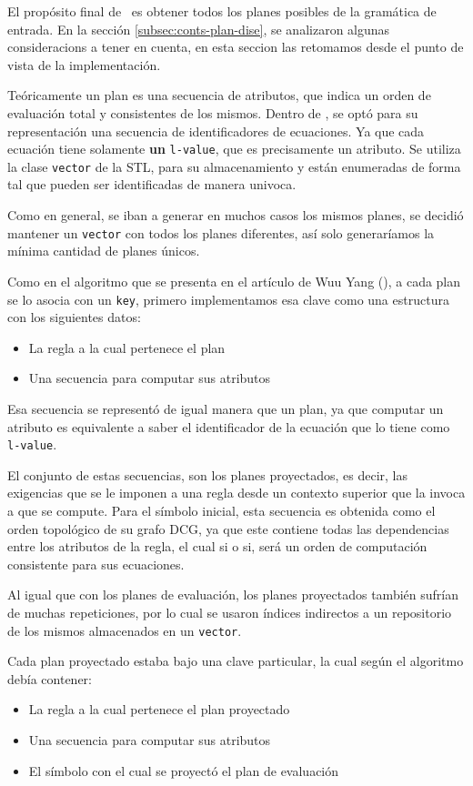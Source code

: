 El propósito final de \maggen\ es obtener todos los planes posibles de la gramática de entrada. En la sección \ref{subsec:conts-plan-dise}, se analizaron algunas consideracions a tener en cuenta, en esta seccion las retomamos desde el punto de vista de la implementación. 

Teóricamente un plan es una secuencia de atributos, que indica un orden de evaluación total y consistentes de los mismos. Dentro de \maggen, se optó para su representación una secuencia de identificadores de ecuaciones. Ya que cada ecuación tiene solamente \textbf{un} \texttt{l-value}, que es precisamente un atributo. Se utiliza la clase \texttt{vector} de la STL, para su almacenamiento y están enumeradas de forma tal que pueden ser identificadas de manera univoca.

Como en general, se iban a generar en muchos casos los mismos planes, se decidió mantener un \texttt{vector} con todos los planes diferentes, así solo generaríamos la mínima cantidad de planes únicos.

Como en el algoritmo que se presenta en el artículo de Wuu Yang (\cite{wuu-yang1}), a cada plan se lo asocia con un \texttt{key}, primero implementamos esa clave como una estructura con los siguientes datos:
\begin{itemize}
\item La regla a la cual pertenece el plan
\item Una secuencia para computar sus atributos
\end{itemize}

Esa secuencia se representó de igual manera que un plan, ya que computar un atributo es equivalente a saber el identificador de la ecuación que lo tiene como \texttt{l-value}.

El conjunto de estas secuencias, son los planes proyectados, es decir, las exigencias que se le imponen a una regla desde un contexto superior que la invoca a que se compute. Para el símbolo inicial, esta secuencia es obtenida como el orden topológico de su grafo DCG, ya que este contiene todas las dependencias entre los atributos de la regla, el cual si o si, será un orden de computación consistente para sus ecuaciones.

Al igual que con los planes de evaluación, los planes proyectados también sufrían de muchas repeticiones, por lo cual se usaron índices indirectos a un repositorio de los mismos almacenados en un \texttt{vector}.

Cada plan proyectado estaba bajo una clave particular, la cual según el algoritmo debía contener:
\begin{itemize}
\item La regla a la cual pertenece el plan proyectado
\item Una secuencia para computar sus atributos
\item El símbolo con el cual se proyectó el plan de evaluación
\end{itemize}

